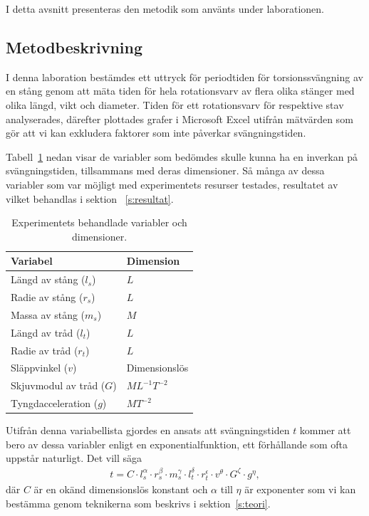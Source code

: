 \documentclass[a4paper]{article}
\begin{document}
I detta avsnitt presenteras den metodik som använts under laborationen.

\subsection{Metodbeskrivning}
I denna laboration bestämdes ett uttryck för periodtiden för torsionssvängning av en stång genom att mäta tiden för hela 
rotationsvarv av flera olika stänger med olika längd, vikt och diameter. Tiden för ett rotationsvarv för respektive stav analyserades, därefter plottades grafer i Microsoft Excel utifrån mätvärden som gör att vi kan exkludera faktorer som inte påverkar svängningstiden.

Tabell~\ref{t:variabler} nedan visar de variabler som bedömdes skulle kunna ha en inverkan på svängningstiden, tillsammans med deras dimensioner. Så många av dessa variabler som var möjligt med experimentets resurser testades, resultatet av vilket behandlas i sektion ~\ref{s:resultat}.

\begin{table}[H]
\caption{Experimentets behandlade variabler och dimensioner.}\label{t:variabler}
\centering
     \begin{tabular}{|l|l|}
       \hline
       Variabel                 & Dimension     \\ \hline
       Längd av stång ($l_s$)   & $L$           \\
       Radie av stång ($r_s$)   & $L$           \\
       Massa av stång ($m_s$)   & $M$           \\
       Längd av tråd ($l_t$)    & $L$           \\
       Radie av tråd ($r_t$)    & $L$           \\
       Släppvinkel ($v$)        & Dimensionslös \\
       Skjuvmodul av tråd ($G$) & $ML^{-1}T^{-2}$   \\
       Tyngdacceleration ($g$)  & $MT^{-2}$       \\
       \hline
     \end{tabular} 
\end{table}
%
Utifrån denna variabellista gjordes en ansats att svängningstiden $t$ kommer att bero av dessa variabler enligt en exponentialfunktion, ett förhållande som ofta uppstår naturligt. Det vill säga
\begin{align}
    \label{eq:dimensionsanalysResultat}
    t= C \cdot l_s^\alpha \cdot r_s^\beta \cdot m_s^\gamma \cdot l_t^\delta \cdot r_t^\epsilon \cdot v^\theta \cdot G^\zeta \cdot g^\eta,
\end{align}
där $C$ är en okänd dimensionslös konstant och $\alpha$ till $\eta$ är exponenter som vi kan bestämma genom teknikerna som beskrivs i sektion~\ref{s:teori}.
\end{document}
